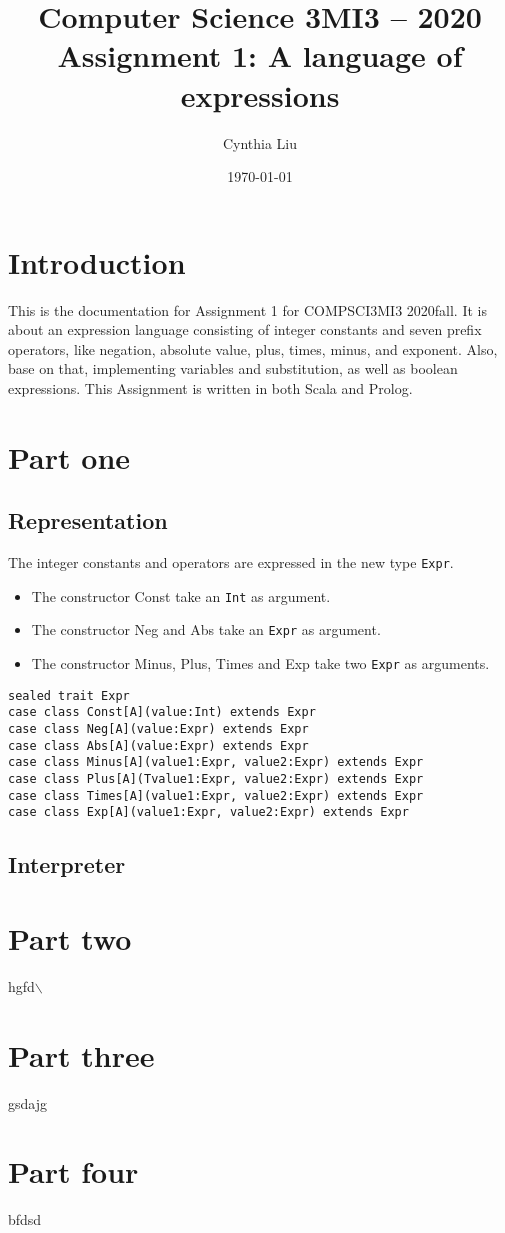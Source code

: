 \documentclass[11pt]{article}
\author{Cynthia Liu}
\date{\today}
\title{Computer Science 3MI3 – 2020 Assignment 1: A language of expressions}
\begin{document}
\maketitle
\tableofcontents


\section{Introduction}
\label{sec:org9fae899}
This is the documentation for Assignment 1 for COMPSCI3MI3 2020fall. 
It is about an expression language consisting of integer constants and seven prefix operators, 
like negation, absolute value, plus, times, minus, and exponent. 
Also, base on that, implementing variables and substitution, as well as boolean expressions.
This Assignment is written in both Scala and Prolog. 

\section{Part one}
\label{sec:orgea006d3}
\subsection{Representation}
\label{sec:org72e2954}
The integer constants and operators are expressed in the new type \texttt{Expr}.
\begin{itemize}
\item The constructor Const take an \texttt{Int} as argument.
\item The constructor Neg and Abs take an \texttt{Expr} as argument.
\item The constructor Minus, Plus, Times and Exp take two \texttt{Expr} as arguments.
\end{itemize}
\begin{verbatim}
sealed trait Expr
case class Const[A](value:Int) extends Expr
case class Neg[A](value:Expr) extends Expr
case class Abs[A](value:Expr) extends Expr
case class Minus[A](value1:Expr, value2:Expr) extends Expr
case class Plus[A](Tvalue1:Expr, value2:Expr) extends Expr
case class Times[A](value1:Expr, value2:Expr) extends Expr
case class Exp[A](value1:Expr, value2:Expr) extends Expr
\end{verbatim}



\subsection{Interpreter}
\label{sec:org8a6a204}

\section{Part two}
\label{sec:org7c8c2da}
hgfd$\backslash$

\section{Part three}
\label{sec:orge841626}
gsdajg

\section{Part four}
\label{sec:org7feb859}
bfdsd
\end{document}
